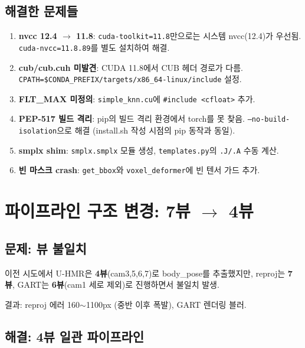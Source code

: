 \documentclass[11pt, a4paper]{report}
\begin{document}
\section{해결한 문제들}

\begin{enumerate}[leftmargin=*]
  \item \textbf{nvcc 12.4 $\rightarrow$ 11.8}: \texttt{cuda-toolkit=11.8}만으로는 시스템 nvcc(12.4)가 우선됨. \texttt{cuda-nvcc=11.8.89}를 별도 설치하여 해결.
  \item \textbf{cub/cub.cuh 미발견}: CUDA 11.8에서 CUB 헤더 경로가 다름. \texttt{CPATH=\$CONDA\_PREFIX/targets/x86\_64-linux/include} 설정.
  \item \textbf{FLT\_MAX 미정의}: \texttt{simple\_knn.cu}에 \texttt{\#include <cfloat>} 추가.
  \item \textbf{PEP-517 빌드 격리}: pip의 빌드 격리 환경에서 torch를 못 찾음. \texttt{--no-build-isolation}으로 해결 (install.sh 작성 시점의 pip 동작과 동일).
  \item \textbf{smplx shim}: \texttt{smplx.smplx} 모듈 생성, \texttt{templates.py}의 \texttt{.J/.A} 수동 계산.
  \item \textbf{빈 마스크 crash}: \texttt{get\_bbox}와 \texttt{voxel\_deformer}에 빈 텐서 가드 추가.
\end{enumerate}


\chapter{파이프라인 구조 변경: 7뷰 $\rightarrow$ 4뷰}

\section{문제: 뷰 불일치}

\begin{warningbox}
이전 시도에서 U-HMR은 \textbf{4뷰}(cam3,5,6,7)로 body\_pose를 추출했지만, reproj는 \textbf{7뷰}, GART는 \textbf{6뷰}(cam1 세로 제외)로 진행하면서 불일치 발생.

결과: reproj 에러 160$\sim$1100px (중반 이후 폭발), GART 렌더링 블러.
\end{warningbox}

\section{해결: 4뷰 일관 파이프라인}
\end{document}
